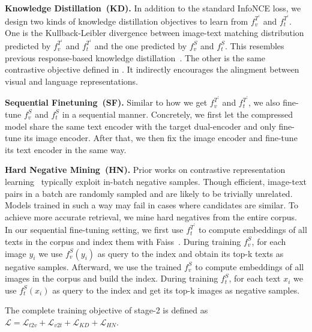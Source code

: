 \noindent
\textbf{Knowledge Distillation~(KD).} In addition to the standard InfoNCE loss, we design two kinds of knowledge distillation objectives to learn from $f_v^{T^{\prime}}$ and $f_t^{T^{\prime}}$. One is the  Kullback-Leibler divergence between image-text matching distribution predicted by $f_v^{T^{\prime}}$ and $f_t^{T^{\prime}}$ and the one predicted by $f_v^{S}$ and $f_t^{S}$. This resembles previous response-based knowledge distillation~\cite{hinton2015distilling}. The other is the same contrastive objective  defined in . It indirectly encourages the alingment between visual and language representations.

\noindent
\textbf{Sequential Finetuning~(SF).} Similar to how we get $f_v^{T^{\prime}}$ and $f_t^{T^{\prime}}$, we also fine-tune $f_v^{S}$ and $f_t^{S}$ in a sequential manner. Concretely, we first let the compressed model share the same text encoder with the target dual-encoder and only fine-tune its image encoder. After that, we then fix the image encoder and fine-tune its text encoder in the same way.

\noindent
\textbf{Hard Negative Mining~(HN).} Prior works on contrastive representation learning~\cite{simclr,simcse}  typically exploit in-batch negative samples. Though efficient, image-text pairs in a batch are randomly sampled and are likely to be trivially unrelated. Models trained in such a way may fail in cases where candidates are similar. To achieve more accurate retrieval, we mine hard negatives from the entire corpus. In our sequential fine-tuning setting, we first use $f_t^{T^{\prime}}$ to compute embeddings of all texts in the corpus and index them with Faiss~\cite{faiss}. During training $f_v^{S}$, for each image $y_i$ we use $f_v^{S}(y_i)$ as query to the index and obtain its top-k texts as negative samples. Afterward, we use the trained $f_v^{S}$ to compute embeddings of all images in the corpus and build the index. During training $f_t^{S}$, for each text $x_i$ we use $f_t^{S}(x_i)$ as query to the index and get its top-k images as negative samples.

The complete training objective of stage-2 is  defined as $\mathcal{L}=\mathcal{L}_{t2v}+\mathcal{L}_{v2t}+\mathcal{L}_{KD}+\mathcal{L}_{HN}$.
